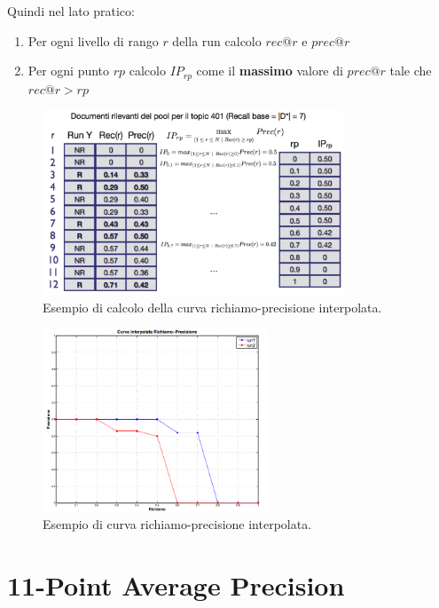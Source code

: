 Quindi nel lato pratico:

\begin{enumerate}
	\item Per ogni livello di rango $r$ della run calcolo $rec@r$ e $prec@r$
	\item Per ogni punto $rp$ calcolo $IP_{rp}$ come il \textbf{massimo} valore di $prec@r$ tale che $rec@r > rp$
\end{enumerate}

\begin{figure}[htbp]
	\centering
	\includegraphics[width=0.8\textwidth]{images/l15-fig-5.png}
	\caption{Esempio di calcolo della curva richiamo-precisione interpolata.}
\end{figure}

\begin{figure}[htbp]
	\centering
	\includegraphics[width=0.6\textwidth]{images/l15-fig-6.png}
	\caption{Esempio di curva richiamo-precisione interpolata.}
\end{figure}

\FloatBarrier
\section{11-Point Average Precision}


